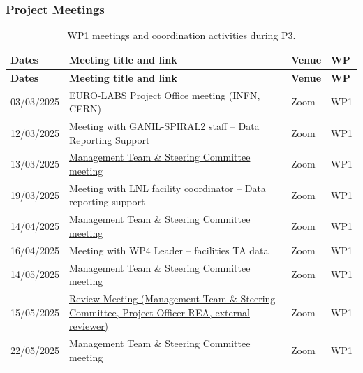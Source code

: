 \subsubsection*{Project Meetings}

\begin{longtable}{|L{0.18\textwidth}|C{0.48\textwidth}|C{0.12\textwidth}|C{0.10\textwidth}|}
    \caption{WP1 meetings and coordination activities during P3.}
    \label{tab:wp1-meetings}
    \\ \hline
    {\bf Dates} & {\bf Meeting title and link} &
     {\bf Venue} & {\bf WP} 
    \\ \hline
    \endfirsthead
    \hline
        {\bf Dates} & {\bf Meeting title and link} &
     {\bf Venue} & {\bf WP} 
  \\ \hline
    \endhead
    \hline
    \endfoot

03/03/2025 &
EURO-LABS Project Office meeting (INFN, CERN) &
Zoom & WP1 \\ \hline

12/03/2025 &
Meeting with GANIL-SPIRAL2 staff -- Data Reporting Support &
Zoom & WP1 \\ \hline

13/03/2025 &
\href{https://agenda.infn.it/event/45159/}
{Management Team \& Steering Committee meeting} &
Zoom & WP1 \\ \hline

19/03/2025 &
Meeting with LNL facility coordinator -- Data reporting support &
Zoom & WP1 \\ \hline

14/04/2025 &
\href{https://agenda.infn.it/event/46743/}
{Management Team \& Steering Committee meeting} &
Zoom & WP1 \\ \hline

16/04/2025 &
Meeting with WP4 Leader -- facilities TA data &
Zoom & WP1 \\ \hline

14/05/2025 &
Management Team \& Steering Committee meeting &
Zoom & WP1 \\ \hline

15/05/2025 &
\href{https://agenda.infn.it/event/47184/}
{Review Meeting (Management Team \& Steering Committee,
Project Officer REA, external reviewer)} &
Zoom & WP1 \\ \hline

22/05/2025 &
Management Team \& Steering Committee meeting &
Zoom & WP1 \\ \hline


\end{longtable}
